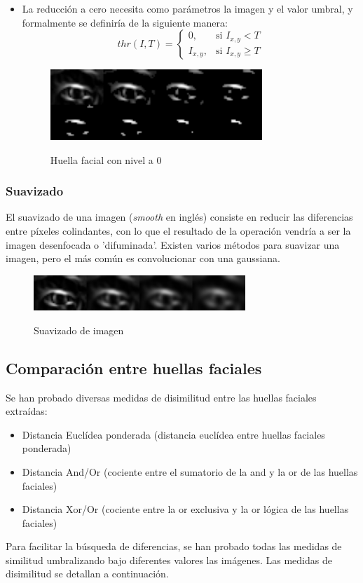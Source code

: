 \begin{itemize}
	\item{La reducción a cero necesita como parámetros la imagen y el valor umbral, y formalmente se definiría de la siguiente manera:}
	\[
		thr(I,T) = \begin{cases}
				0, & \text{si $I_{x,y} < T$}\\
				I_{x,y}, & \text{si $I_{x,y} \geq T$}
			\end{cases}
	\]

	\begin{figure}[h!]
		\centering
		\includegraphics[width=8cm]{imagenes/umbral_tozero.png}\\
		\caption{Huella facial con nivel a 0}
		\label{fig:thr_tozero}
	\end{figure}

\end{itemize}

\subsubsection{Suavizado}
El suavizado de una imagen (\textit{smooth} en inglés) consiste en reducir las diferencias entre píxeles colindantes, con lo que el resultado de la operación vendría a ser la imagen desenfocada o 'difuminada'. Existen varios métodos para suavizar una imagen, pero el más común es convolucionar con una gaussiana.

	\begin{figure}[h!]
		\centering
		\includegraphics[width=8cm]{imagenes/suavizado.png}\\
		\caption{Suavizado de imagen}
		\label{fig:smooth}
	\end{figure}



\subsection{Comparación entre huellas faciales}

Se han probado diversas medidas de disimilitud entre las huellas faciales extraídas:
\begin{itemize}
	\item{Distancia Euclídea ponderada (distancia euclídea entre huellas faciales ponderada)}
	\item{Distancia And/Or (cociente entre el sumatorio de la and y la or de las huellas faciales)}
	\item{Distancia Xor/Or (cociente entre la or exclusiva y la or lógica de las huellas faciales)}
\end{itemize}
Para facilitar la búsqueda de diferencias, se han probado todas las medidas de similitud umbralizando bajo diferentes valores las imágenes.
Las medidas de disimilitud se detallan a continuación.
